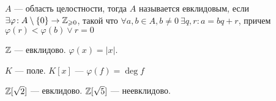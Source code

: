 \begin{definition}
	$A$ --- область целостности, тогда  $A$ называется евклидовым, если  $\exists \varphi\!: A \setminus \{0\} \to \mathbb{Z}_{\geqslant 0}$, такой что $\forall a, b \in A, b \neq 0\ \exists q, r\!: a=bq+r$, причем  $\varphi(r) < \varphi(b) \lor r = 0$
\end{definition}
\begin{example}
    $\mathbb{Z}$ --- евклидово.  $\varphi(x) = |x|$.
\end{example}
\begin{example}
    $K$ --- поле.  $K[x]$ --- $\varphi(f) = \deg f$
\end{example}
\begin{example}
    $\mathbb{Z}[\sqrt{2}]$ --- евклидово. $\mathbb{Z}[\sqrt{5}]$ --- неевклидово.
\end{example}

